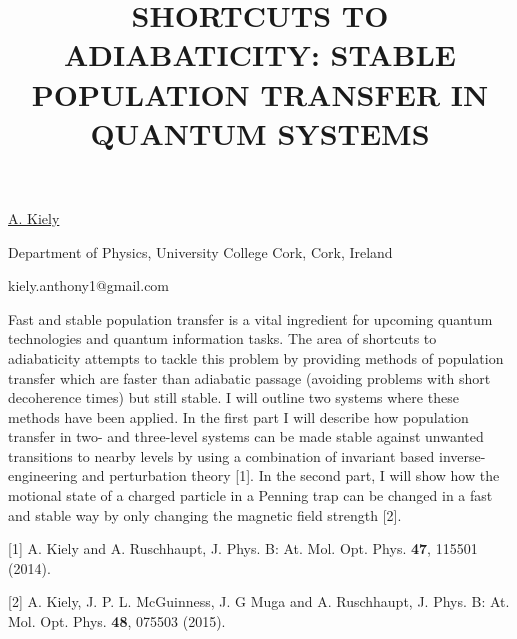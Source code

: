 \title{SHORTCUTS TO ADIABATICITY: STABLE POPULATION TRANSFER IN QUANTUM SYSTEMS}

\underline{A. Kiely} 

{\normalsize{\vspace{-4mm}
Department of Physics,
University College Cork,
Cork,
Ireland

\email kiely.anthony1@gmail.com}}

Fast and stable population transfer is a vital ingredient for upcoming quantum technologies
and quantum information tasks. The area of shortcuts to adiabaticity attempts to
tackle this problem by providing methods of population transfer which are faster than
adiabatic passage (avoiding problems with short decoherence times) but
still stable. I will outline two systems where these methods
have been applied. In the first part I will describe how population transfer in two- and three-level
systems can be made stable against unwanted transitions to nearby levels by using a combination of
invariant based inverse-engineering and perturbation theory [1]. In the second part, I will show how
the motional state of a charged particle in a Penning trap can be changed in a fast and stable way by
only changing the magnetic field strength [2].

{\normalsize
[1] A. Kiely and A. Ruschhaupt, J. Phys. B: At. Mol. Opt. Phys. \textbf{47}, 115501 (2014).
\vsp

[2] A. Kiely, J. P. L. McGuinness, J. G Muga and A. Ruschhaupt, J. Phys. B: At. Mol. Opt. Phys. \textbf{48}, 075503 (2015).
}

\vspace{\baselineskip}
